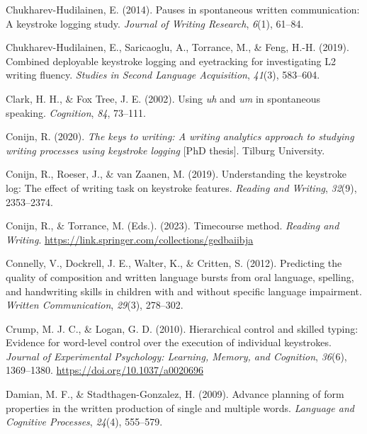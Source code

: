 \documentclass[
  man,floatsintext]{apa7}
\newlength{\cslhangindent}
\newlength{\cslentryspacingunit} %
\newenvironment{CSLReferences}[2] %
 {%
  \setlength{\parindent}{0pt}
  \ifodd #1
  \let\oldpar\par
  \def\par{\hangindent=\cslhangindent\oldpar}
  \fi
  \setlength{\parskip}{#2\cslentryspacingunit}
 }%
 {}
\begin{document}
\begin{CSLReferences}{1}{0}
\leavevmode{}%
Chukharev-Hudilainen, E. (2014). Pauses in spontaneous written communication: {A} keystroke logging study. \emph{Journal of Writing Research}, \emph{6}(1), 61--84.

\leavevmode{}%
Chukharev-Hudilainen, E., Saricaoglu, A., Torrance, M., \& Feng, H.-H. (2019). Combined deployable keystroke logging and eyetracking for investigating {L2} writing fluency. \emph{Studies in Second Language Acquisition}, \emph{41}(3), 583--604.

\leavevmode{}%
Clark, H. H., \& Fox Tree, J. E. (2002). Using \emph{uh} and \emph{um} in spontaneous speaking. \emph{Cognition}, \emph{84}, 73--111.

\leavevmode{}%
Conijn, R. (2020). \emph{The keys to writing: A writing analytics approach to studying writing processes using keystroke logging} {[}PhD thesis{]}. Tilburg University.

\leavevmode{}%
Conijn, R., Roeser, J., \& van Zaanen, M. (2019). Understanding the keystroke log: The effect of writing task on keystroke features. \emph{Reading and Writing}, \emph{32}(9), 2353--2374.

\leavevmode{}%
Conijn, R., \& Torrance, M. (Eds.). (2023). Timecourse method. \emph{Reading and Writing}. \url{https://link.springer.com/collections/gedbaiibja}

\leavevmode{}%
Connelly, V., Dockrell, J. E., Walter, K., \& Critten, S. (2012). Predicting the quality of composition and written language bursts from oral language, spelling, and handwriting skills in children with and without specific language impairment. \emph{Written Communication}, \emph{29}(3), 278--302.

\leavevmode{}%
Crump, M. J. C., \& Logan, G. D. (2010). Hierarchical control and skilled typing: Evidence for word-level control over the execution of individual keystrokes. \emph{Journal of Experimental Psychology: Learning, Memory, and Cognition}, \emph{36}(6), 1369--1380. \url{https://doi.org/10.1037/a0020696}

\leavevmode{}%
Damian, M. F., \& Stadthagen-Gonzalez, H. (2009). Advance planning of form properties in the written production of single and multiple words. \emph{Language and Cognitive Processes}, \emph{24}(4), 555--579.


\end{CSLReferences}
\end{document}
